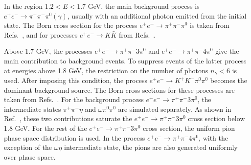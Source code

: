 \documentclass[twocolumn,aps,prd,floatfix,nofootinbib,superscriptaddress]{revtex4-2}
\begin{document}
In the region \( 1.2 < E < 1.7 \) GeV, the main background process is \( e^+e^- \to \pi^+\pi^-\pi^0(\gamma) \), usually with an additional photon emitted from the initial state.
The Born cross section for the process \( e^+e^- \to \pi^+\pi^-\pi^0 \) is taken from Refs.~\cite{snd_3pi_1,snd_3pi_2,snd_3pi_3}, and for processes \( e^+e^- \to K\bar{K} \) from Refs.~\cite{pdg,snd_kk,babar_kk}.

Above 1.7 GeV, the processes \( e^+e^- \to \pi^+\pi^-3\pi^0 \) and \( e^+e^- \to \pi^+\pi^-4\pi^0 \) give the main contribution to background events.
To suppress events of the latter process at energies above 1.8 GeV, the restriction on the number of photons \( n_\gamma < 6 \) is used.
After imposing this condition, the process \( e^+e^- \to K^+K^-\pi^0\pi^0 \) becomes the dominant background source.
The Born cross sections for these processes are taken from Refs.~\cite{babar_2pi3pi0,babar_2pi4pi0,babar_4pic1pi0,babar_kk2pic}.
For the background process \( e^+e^- \to \pi^+\pi^-3\pi^0 \), the intermediate states $\pi^+\pi^-\eta$ and $\omega\pi^0 \pi^0$ are simulated separately.
As shown in Ref.~\cite{babar_2pi3pi0}, these two contributions saturate the \( e^+e^- \to \pi^+\pi^-3\pi^0 \) cross section below 1.8 GeV.
For the rest of the \( e^+e^- \to \pi^+\pi^-3\pi^0 \) cross section, the uniform pion phase space distribution is used.
In the process \( e^+e^- \to \pi^+\pi^ - 4\pi^0 \), with the exception of the $\omega\eta$ intermediate state, the pions are also generated uniformly over phase space.
\end{document}
